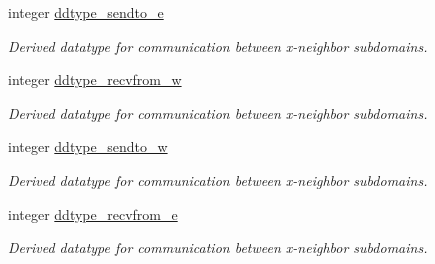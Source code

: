 \textbf{ }\par
\begin{DoxyCompactItemize}
\item 
integer \mbox{\hyperlink{namespacempi__subdomain_a93395266b1630e5a91e8e89531dfcec6}{ddtype\+\_\+sendto\+\_\+e}}
\begin{DoxyCompactList}\small\item\em Derived datatype for communication between x-\/neighbor subdomains. \end{DoxyCompactList}\item 
integer \mbox{\hyperlink{namespacempi__subdomain_a0b2a4ab6d6a88a3817f473a5c2c172b9}{ddtype\+\_\+recvfrom\+\_\+w}}
\begin{DoxyCompactList}\small\item\em Derived datatype for communication between x-\/neighbor subdomains. \end{DoxyCompactList}\item 
integer \mbox{\hyperlink{namespacempi__subdomain_a0701fde01daea1a6fd51b62c75b8ee82}{ddtype\+\_\+sendto\+\_\+w}}
\begin{DoxyCompactList}\small\item\em Derived datatype for communication between x-\/neighbor subdomains. \end{DoxyCompactList}\item 
integer \mbox{\hyperlink{namespacempi__subdomain_a18a84c0f3ca27cd4dd73057ff035f341}{ddtype\+\_\+recvfrom\+\_\+e}}
\begin{DoxyCompactList}\small\item\em Derived datatype for communication between x-\/neighbor subdomains. \end{DoxyCompactList}\end{DoxyCompactItemize}

